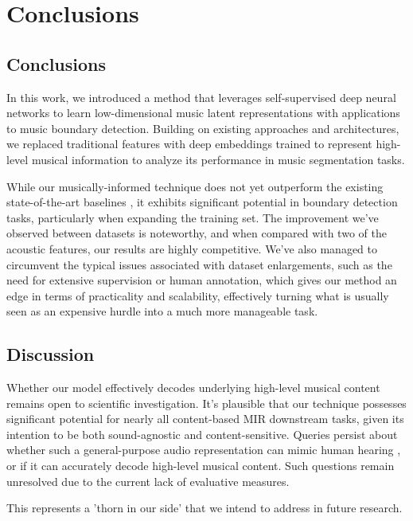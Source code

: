 \chapter{Conclusions}

\section{Conclusions}

In this work, we introduced a method that leverages self-supervised deep neural networks to learn low-dimensional music latent representations with applications to music boundary detection. Building on existing approaches and architectures, we replaced traditional features with deep embeddings trained to represent high-level musical information to analyze its performance in music segmentation tasks.

While our musically-informed technique does not yet outperform the existing state-of-the-art baselines \cite{deepfeaturesegment, SalamonDeepSegmentation}, it exhibits significant potential in boundary detection tasks, particularly when expanding the training set. The improvement we've observed between datasets is noteworthy, and when compared with two of the acoustic features, our results are highly competitive. We've also managed to circumvent the typical issues associated with dataset enlargements, such as the need for extensive supervision or human annotation, which gives our method an edge in terms of practicality and scalability, effectively turning what is usually seen as an expensive hurdle into a much more manageable task.

\section{Discussion}

Whether our model effectively decodes underlying high-level musical content remains open to scientific investigation. It's plausible that our technique possesses significant potential for nearly all content-based MIR downstream tasks, given its intention to be both sound-agnostic and content-sensitive. Queries persist about whether such a general-purpose audio representation can mimic human hearing \cite{Li2023MERT:Training, Turian2022HEAR:Representations}, or if it can accurately decode high-level musical content. Such questions remain unresolved due to the current lack of evaluative measures. 

This represents a 'thorn in our side' that we intend to address in future research.

